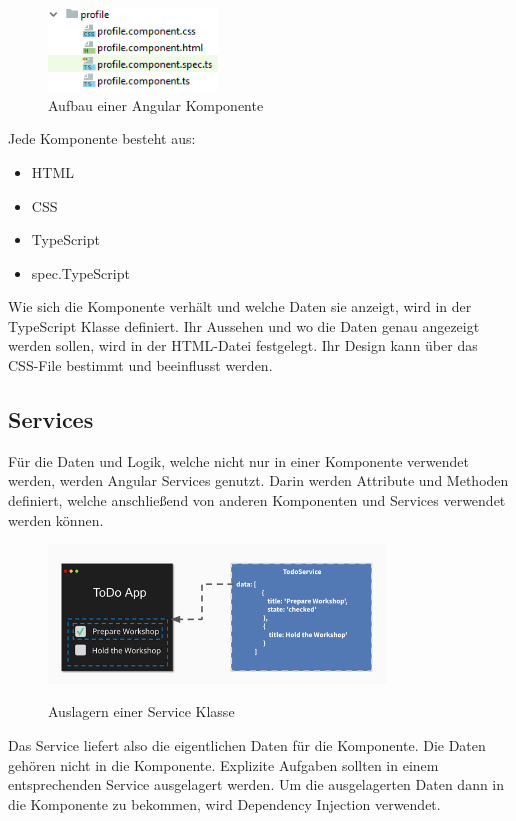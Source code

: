 \begin{figure}[h]
    \centering
    \includegraphics[width=0.4\textwidth]{pics/Aufbau_Komponente.png}
    \caption{Aufbau einer Angular Komponente}
\end{figure}

Jede Komponente besteht aus:

\begin{itemize}
    \item HTML
    \item CSS
    \item TypeScript
    \item spec.TypeScript 
\end{itemize}

Wie sich die Komponente verhält und welche Daten sie anzeigt, wird in der TypeScript Klasse definiert. Ihr Aussehen und wo die Daten genau angezeigt werden sollen, wird in der HTML-Datei festgelegt. Ihr Design kann über das CSS-File bestimmt und beeinflusst werden.
\cite{AngularKomponenten}

\subsection{Services}
Für die Daten und Logik, welche nicht nur in einer Komponente verwendet werden, werden Angular Services genutzt. Darin werden Attribute und Methoden definiert, welche anschließend von anderen Komponenten und Services verwendet werden können.

\begin{figure}[h]
    \centering
    \includegraphics[width=0.8\textwidth]{pics/Service_Klasse.png}
    \caption{Auslagern einer Service Klasse}
    \cite{Service}
\end{figure}

Das Service liefert also die eigentlichen Daten für die Komponente. Die Daten gehören nicht in die Komponente. Explizite Aufgaben sollten in einem entsprechenden Service ausgelagert werden. Um die ausgelagerten Daten dann in die Komponente zu bekommen, wird Dependency Injection verwendet.

